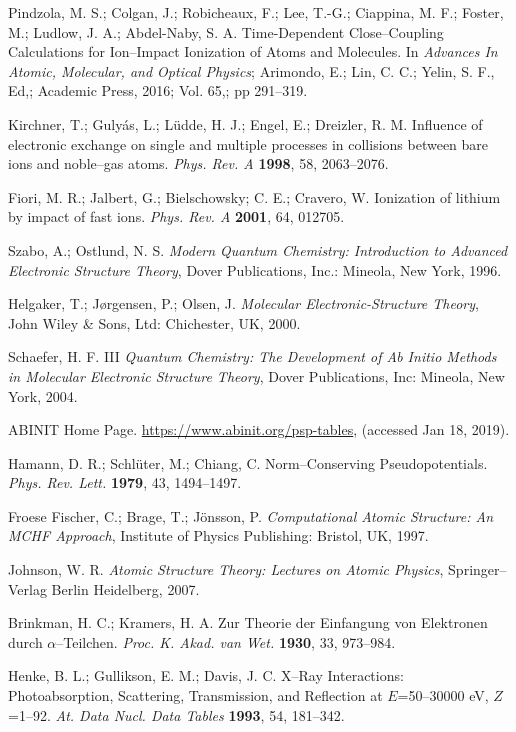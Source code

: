 \documentclass[10pt]{article}
\begin{document}
\begin{thebibliography}{10}
Pindzola, M. S.; Colgan, J.; Robicheaux, F.; Lee, T.-G.; Ciappina, M. F.;
Foster, M.; Ludlow, J. A.; Abdel-Naby,
 S. A.
Time-Dependent Close--Coupling Calculations for Ion--Impact Ionization 
of Atoms and Molecules. 
In {\it Advances In Atomic, Molecular, and Optical Physics};
Arimondo, E.; Lin, C. C.; Yelin,
 S. F., Ed,;
Academic Press,
 2016; Vol. 65,; pp 291--319.

Kirchner, T.; Guly\'as, L.; L\"udde, H. J.; Engel, E.; Dreizler, R. M. 
Influence of electronic exchange on single and multiple processes in 
collisions between bare ions and noble--gas atoms.
{\it Phys. Rev. A} {\bf 1998}, 58, 2063--2076.

Fiori, M. R.; Jalbert, G.; Bielschowsky; C. E.; Cravero, W.
Ionization of lithium by impact of fast ions.
{\it Phys. Rev. A} {\bf 2001}, 64, 012705.

Szabo, A.; Ostlund, N. S.
{\it Modern Quantum Chemistry: Introduction to Advanced Electronic 
Structure Theory},
Dover Publications, Inc.: Mineola, New York, 1996.

Helgaker, T.; J{\o}rgensen, P.; Olsen, J.
{\it Molecular Electronic-Structure Theory},
John Wiley {\&} Sons, Ltd: Chichester, UK, 2000.

Schaefer, H. F. III
{\it Quantum Chemistry: The Development of Ab Initio Methods in
Molecular Electronic Structure Theory},
Dover Publications, Inc: Mineola, New York, 2004.

ABINIT Home Page. 
\url{https://www.abinit.org/psp-tables},
(accessed Jan 18, 2019).

Hamann, D. R.; Schl\"uter, M.; Chiang, C.
Norm--Conserving Pseudopotentials.
{\it Phys. Rev. Lett.} {\bf 1979}, 43, 1494--1497.

Froese Fischer, C.; Brage, T.; J\"onsson, P.
{\it Computational Atomic Structure: An MCHF Approach},
Institute of Physics Publishing: Bristol, UK, 1997.

Johnson, W. R. 
{\it Atomic Structure Theory: Lectures on Atomic Physics},
Springer--Verlag Berlin Heidelberg, 2007.

Brinkman, H. C.; Kramers, H. A.
Zur Theorie der Einfangung von Elektronen durch $\alpha$--Teilchen.
{\it Proc. K. Akad. van Wet.} {\bf 1930}, 33, 973--984.

Henke, B. L.; Gullikson, E. M.; Davis, J. C. 
X--Ray Interactions: Photoabsorption, Scattering, Transmission, and Reflection at $E$=50--30000 eV, $Z$=1--92.
{\it At. Data Nucl. Data Tables} {\bf 1993}, 54, 181--342.


\end{thebibliography}
\end{document}
